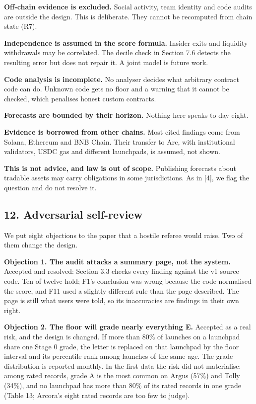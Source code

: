 \textbf{Off-chain evidence is excluded.} Social activity, team identity and code audits are outside the design. This is deliberate. They cannot be recomputed from chain state (R7).

\textbf{Independence is assumed in the score formula.} Insider exits and liquidity withdrawals may be correlated. The decile check in Section 7.6 detects the resulting error but does not repair it. A joint model is future work.

\textbf{Code analysis is incomplete.} No analyser decides what arbitrary contract code can do. Unknown code gets no floor and a warning that it cannot be checked, which penalises honest custom contracts.

\textbf{Forecasts are bounded by their horizon.} Nothing here speaks to day eight.

\textbf{Evidence is borrowed from other chains.} Most cited findings come from Solana, Ethereum and BNB Chain. Their transfer to Arc, with institutional validators, USDC gas and different launchpads, is assumed, not shown.

\textbf{This is not advice, and law is out of scope.} Publishing forecasts about tradable assets may carry obligations in some jurisdictions. As in {[}4{]}, we flag the question and do not resolve it.

\subsection{12. Adversarial self-review}\label{adversarial-self-review}

We put eight objections to the paper that a hostile referee would raise. Two of them change the design.

\textbf{Objection 1. The audit attacks a summary page, not the system.} Accepted and resolved: Section 3.3 checks every finding against the v1 source code. Ten of twelve hold; F1's conclusion was wrong because the code normalised the score, and F11 used a slightly different rule than the page described. The page is still what users were told, so its inaccuracies are findings in their own right.

\textbf{Objection 2. The floor will grade nearly everything E.} Accepted as a real risk, and the design is changed. If more than 80\% of launches on a launchpad share one Stage 0 grade, the letter is replaced on that launchpad by the floor interval and its percentile rank among launches of the same age. The grade distribution is reported monthly. In the first data the risk did not materialise: among rated records, grade A is the most common on Argus (57\%) and Tolly (34\%), and no launchpad has more than 80\% of its rated records in one grade (Table 13; Arcora's eight rated records are too few to judge).


